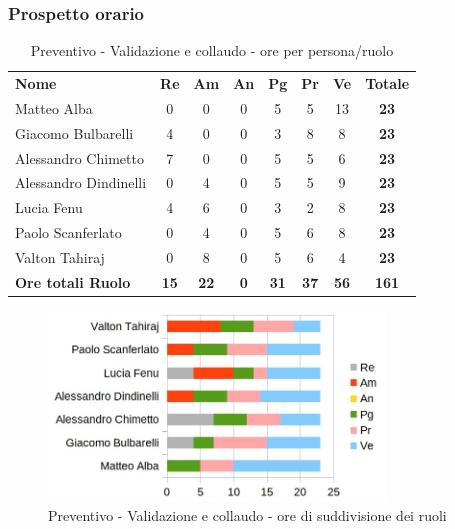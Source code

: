 	\subsubsection{Prospetto orario}

		\begin{table} [h!]
			\begin{center}
				\begin{tabular} { m{3.5cm} c c c c c c c }
					\rowcolor{lightgray}
					\textbf{Nome} & \textbf{Re} & \textbf{Am} & \textbf{An} & \textbf{Pg} & \textbf{Pr} & \textbf{Ve} & \textbf{Totale} \\
					Matteo Alba & 0& 0&0 & 5 & 5 & 13 & \textbf{23} \\
					Giacomo Bulbarelli & 4 & 0&0 & 3 & 8 & 8 & \textbf{23} \\
					Alessandro Chimetto & 7 & 0& 0& 5 & 5 & 6 & \textbf{23} \\
					Alessandro Dindinelli &0 & 4 &0 & 5 & 5 & 9 & \textbf{23} \\
					Lucia Fenu & 4 & 6 & 0& 3 & 2 & 8 & \textbf{23} \\
					Paolo Scanferlato &0 & 4 & 0& 5 & 6 & 8 & \textbf{23} \\
					Valton Tahiraj &0 & 8 &0 & 5 & 6 & 4 & \textbf{23} \\
					\textbf{Ore totali Ruolo} & \textbf{15} & \textbf{22} & \textbf{0} & \textbf{31} & \textbf{37}& \textbf{56} & \textbf{161}
				\end{tabular}
				\caption{Preventivo - Validazione e collaudo - ore per persona/ruolo}
			\end{center}
		\end{table}
	
		\begin{figure} [h!]
			\centering
			\includegraphics[width=0.8\textwidth]{res/img/grafici/validazione_e_collaudo_ore_ruolo.jpg}
			\caption{Preventivo - Validazione e collaudo - ore di suddivisione dei ruoli} 
		\end{figure}
	
